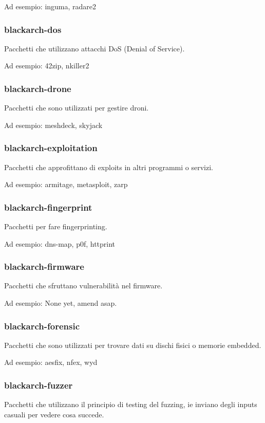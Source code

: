 \documentclass[a4paper, oneside, 11pt]{book}
\begin{document}
Ad esempio: inguma, radare2

\subsubsection{blackarch-dos}
Pacchetti che utilizzano attacchi DoS (Denial of Service).

Ad esempio: 42zip, nkiller2

\subsubsection{blackarch-drone}
Pacchetti che sono utilizzati per gestire droni.

Ad esempio: meshdeck, skyjack

\subsubsection{blackarch-exploitation}
Pacchetti che approfittano di exploits in altri programmi o servizi.

Ad esempio: armitage, metasploit, zarp

\subsubsection{blackarch-fingerprint}
Pacchetti per fare fingerprinting.

Ad esempio: dns-map, p0f, httprint

\subsubsection{blackarch-firmware}
Pacchetti che sfruttano vulnerabilità nel firmware.

Ad esempio: None yet, amend asap.

\subsubsection{blackarch-forensic}
Pacchetti che sono utilizzati per trovare dati su dischi fisici o memorie embedded.

Ad esempio: aesfix, nfex, wyd

\subsubsection{blackarch-fuzzer}
Pacchetti che utilizzano il principio di testing del fuzzing, ie
inviano degli inputs casuali per vedere cosa succede.
\end{document}
